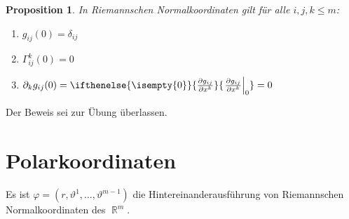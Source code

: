 \documentclass[paper=A4, twoside, chapterprefix=true, bibliography=totoc, headsepline]{scrbook}
\let\temp\phi{}
\let\phi\varphi{}
\let\varphi\temp{}
\let\temp\theta{}
\let\theta\vartheta{}
\let\vartheta\temp{}
\let\temp\epsilon{}
\let\epsilon\varepsilon{}
\let\varepsilon\temp{}
\let\temp\rho{}
\let\rho\varrho{}
\let\varrho\temp{}
\DeclareMathOperator{\R}{\mathbb{R}}
\newcommand{\pdifffrac}[3][]{\ifthenelse{\isempty{#1}}{\frac{\partial #2}{\partial #3}}{\left. \frac{\partial #2}{\partial #3} \right|_{#1}}}
\theoremstyle{plain}
\newtheorem{Prop}[Dfn]{Proposition}
\theoremstyle{nonumberplain}
\theoremstyle{empty}
\theoremstyle{break}
\begin{document}
\begin{Prop}
  In Riemannschen Normalkoordinaten gilt f\"ur alle $i,j,k \leq m$:
  \begin{enumerate}[label=(\roman*)]
  \item
    $g_{ij}(0) = \delta_{ij}$
  \item
    $\Gamma^k_{ij}(0) = 0$
  \item
    $\partial_k g_{ij}(0) = \pdifffrac[0]{g_{ij}}{x^k} = 0$
  \end{enumerate}\end{Prop}

Der Beweis sei zur \"Ubung \"uberlassen.

\section{Polarkoordinaten}

Es ist $\phi = (r, \theta^1, \ldots, \theta^{m-1})$ die Hintereinanderausf\"uhrung von Riemannschen Normalkoordinaten des $\R^m$.
\end{document}
